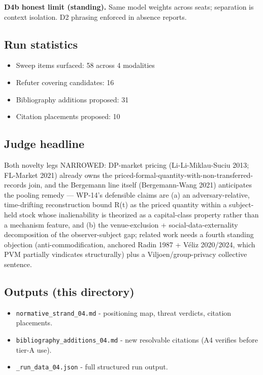 \documentclass[
  11pt,
]{article}
\providecommand{\tightlist}{%
  \setlength{\itemsep}{0pt}\setlength{\parskip}{0pt}}
\begin{document}
\textbf{D4b honest limit (standing).} Same model weights across seats;
separation is context isolation. D2 phrasing enforced in absence
reports.

\subsection{Run statistics}\label{run-statistics}

\begin{itemize}
\tightlist
\item
  Sweep items surfaced: 58 across 4 modalities
\item
  Refuter covering candidates: 16
\item
  Bibliography additions proposed: 31
\item
  Citation placements proposed: 10
\end{itemize}

\subsection{Judge headline}\label{judge-headline}

Both novelty legs NARROWED: DP-market pricing (Li-Li-Miklau-Suciu 2013;
FL-Market 2021) already owns the
priced-formal-quantity-with-non-transferred-records join, and the
Bergemann line itself (Bergemann-Wang 2021) anticipates the pooling
remedy --- WP-14's defensible claims are (a) an adversary-relative,
time-drifting reconstruction bound R(t) as the priced quantity within a
subject-held stock whose inalienability is theorized as a capital-class
property rather than a mechanism feature, and (b) the venue-exclusion +
social-data-externality decomposition of the observer-subject gap;
related work needs a fourth standing objection (anti-commodification,
anchored Radin 1987 + Véliz 2020/2024, which PVM partially vindicates
structurally) plus a Viljoen/group-privacy collective sentence.

\subsection{Outputs (this directory)}\label{outputs-this-directory}

\begin{itemize}
\tightlist
\item
  \texttt{normative\_strand\_04.md} - positioning map, threat verdicts,
  citation placements.
\item
  \texttt{bibliography\_additions\_04.md} - new resolvable citations (A4
  verifies before tier-A use).
\item
  \texttt{\_run\_data\_04.json} - full structured run output.
\end{itemize}
\end{document}
